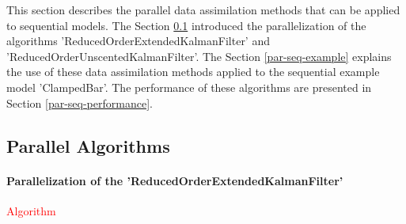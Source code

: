 \documentclass{tufte-book}
\begin{document}
This section describes the parallel data assimilation methods that can be applied to sequential models. The Section \ref{par-seq-algo} introduced the parallelization of the algorithms 'ReducedOrderExtendedKalmanFilter' \cite{Nerger-Thesis} and 'ReducedOrderUnscentedKalmanFilter'. The Section \ref{par-seq-example} explains  the use of these data assimilation methods applied to the sequential example model 'ClampedBar'. The performance of these algorithms are presented in Section \ref{par-seq-performance}.



\hypertarget{par-seq-algo}{}\subsection{Parallel Algorithms}\label{par-seq-algo}


\hypertarget{par-seq-algo-roekf}{}\paragraph{Parallelization of the 'ReducedOrderExtendedKalmanFilter'}\label{par-seq-algo-roekf}


\par \textcolor{red}{Algorithm}\\
\end{document}
